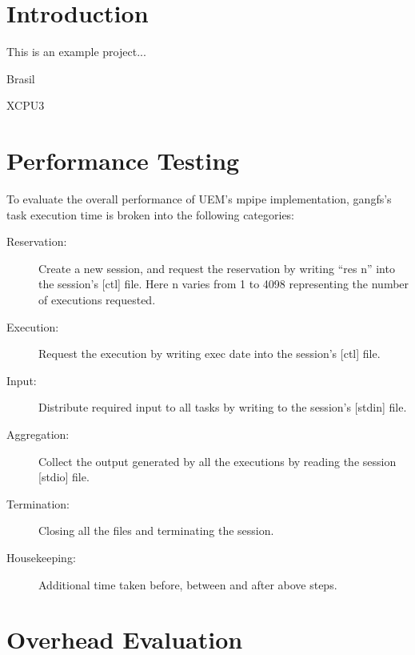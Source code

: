 \documentclass{article}
\begin{document}
\maketitle

\section*{Introduction}
This is an example project...

Brasil~\cite{Brasil:2011:BBR}

XCPU3~\cite{Pravin:2010:XWD}

\section*{Performance Testing}

To evaluate the overall performance of UEM's mpipe implementation,
gangfs's task execution time is broken into the following categories:

\begin{description}
  \item [Reservation:] Create a new session, and request the
    reservation by writing ``res n'' into the session's [ctl] file.
    Here n varies from 1 to 4098 representing the number of executions
    requested.
  \item [Execution:] Request the execution by writing exec date into
    the session's [ctl] file.
  \item [Input:] Distribute required input to all tasks by writing to
    the session's [stdin] file.
  \item [Aggregation:] Collect the output generated by all the
    executions by reading the session [stdio] file.
  \item [Termination:] Closing all the files and terminating the
    session.
  \item [Housekeeping:] Additional time taken before, between and
    after above steps.
\end{description}

\section*{Overhead Evaluation}
\end{document}
